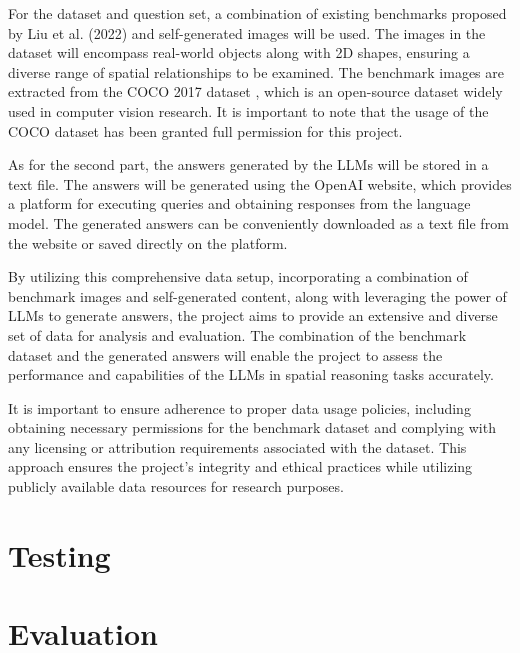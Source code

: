 \documentclass[journal,10pt]{IEEEtran}
\begin{document}
For the dataset and question set, a combination of existing benchmarks proposed by Liu et al. (2022) \cite{liu2022visual} and self-generated images will be used. The images in the dataset will encompass real-world objects along with 2D shapes, ensuring a diverse range of spatial relationships to be examined. The benchmark images are extracted from the COCO 2017 dataset \cite{lin2014microsoft}, which is an open-source dataset widely used in computer vision research. It is important to note that the usage of the COCO dataset has been granted full permission for this project.

As for the second part, the answers generated by the LLMs will be stored in a text file. The answers will be generated using the OpenAI website, which provides a platform for executing queries and obtaining responses from the language model. The generated answers can be conveniently downloaded as a text file from the website or saved directly on the platform.

By utilizing this comprehensive data setup, incorporating a combination of benchmark images and self-generated content, along with leveraging the power of LLMs to generate answers, the project aims to provide an extensive and diverse set of data for analysis and evaluation. The combination of the benchmark dataset and the generated answers will enable the project to assess the performance and capabilities of the LLMs in spatial reasoning tasks accurately.

It is important to ensure adherence to proper data usage policies, including obtaining necessary permissions for the benchmark dataset and complying with any licensing or attribution requirements associated with the dataset. This approach ensures the project's integrity and ethical practices while utilizing publicly available data resources for research purposes.

\section{Testing}

\section{Evaluation}
\end{document}
